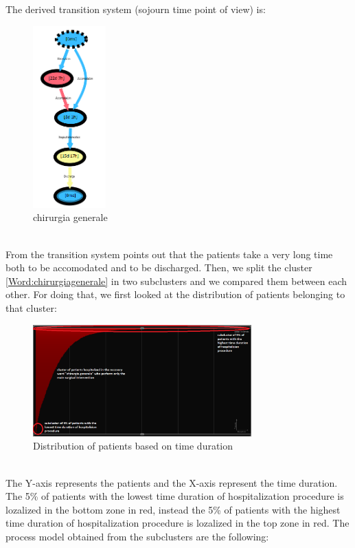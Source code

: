 \clearpage
\noindent
The derived transition system (sojourn time point of view) is:
\begin{figure} [htbp]
\includegraphics[width=0.25\textwidth , keepaspectratio]{RicoveriTransitionSystemSojourn0901}
\caption{chirurgia generale}
\end{figure}\\
From the transition system points out that the patients take a very long time both to be accomodated and to be discharged. Then, we split the cluster \ref{Word:chirurgiagenerale} in two subclusters and we compared them between each other. For doing that, we first looked at the distribution of patients belonging to that cluster:
\begin{figure} [htbp]
\includegraphics[width=0.75\textwidth , keepaspectratio]{RicoveriChart}
\caption{Distribution of patients based on time duration}
\end{figure}\\
The Y-axis represents the patients and the X-axis represent the time duration. The 5\% of patients with the lowest time duration of hospitalization procedure is lozalized in the bottom zone in red, instead the 5\% of patients with the highest time duration of hospitalization procedure is lozalized in the top zone in red. The process model obtained from the subclusters are the following:
